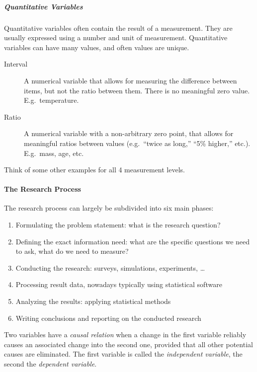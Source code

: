 \subparagraph{Quantitative Variables}

Quantitative variables often contain the result of a measurement.
They are usually expressed using a number and unit of measurement.
Quantitative variables can have many values, and often values are unique.

\begin{description}
    \item [Interval] A numerical variable that allows for measuring the difference between items, but not the ratio between them. There is no meaningful zero value. E.g.~temperature.
    \item [Ratio] A numerical variable with a non-arbitrary zero point, that allows for meaningful ratios between values (e.g.~``twice as long,'' ``5\% higher,'' etc.). E.g.~mass, age, etc.
\end{description}

\begin{exercise}
    Think of some other examples for all 4 measurement levels.
\end{exercise}

\paragraph{The Research Process}

The research process can largely be subdivided into six main phases:

\begin{enumerate}
	\item Formulating the problem statement: what is the research question?
	\item Defining the exact information need: what are the specific questions we need to ask, what do we need to measure?
	\item Conducting the research: surveys, simulations, experiments, \dots
	\item Processing result data, nowadays typically using statistical software
	\item Analyzing the results: applying statistical methods
	\item Writing conclusions and reporting on the conducted research
\end{enumerate}

\begin{definition}
    Two variables have a \emph{causal relation} when a change in the first variable reliably causes an associated change into the second one, provided that all other potential causes are eliminated. The first variable is called the \emph{independent variable}, the second the \emph{dependent variable}.
\end{definition}

